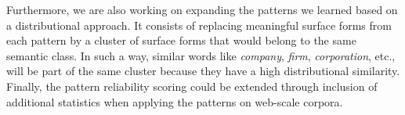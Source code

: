 \documentclass[output=paper]{langsci/langscibook}
\begin{document}
Furthermore, we are also working on expanding the patterns we learned based on a distributional approach. It consists of replacing meaningful surface forms from each pattern by a cluster of surface forms that would belong to the same semantic class. In such a way, similar words like \textit{company}, \textit{firm}, \textit{corporation}, etc., will be part of the same cluster because they have a high distributional similarity. Finally, the pattern reliability scoring could be extended through inclusion of additional statistics when applying the patterns on web-scale corpora.


{\sloppy\printbibliography[heading=subbibliography,notkeyword=this]}
\end{document}
